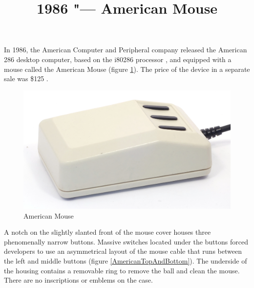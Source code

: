 \documentclass[11pt, a4paper]{article}
\begin{document}
\title{1986 "--- American Mouse}
\date{}
\maketitle

In 1986, the American Computer and Peripheral company released the American 286 desktop computer, based on the i80286 processor \cite{adv}, and equipped with a mouse called the American Mouse (figure \ref{fig:AmericanPic}). The price of the device in a separate sale was \$125 \cite{review}.

\begin{figure}[h]
    \centering
    \includegraphics[scale=0.7]{1986_american_mouse/pic_30.jpg}
    \caption{American Mouse}
    \label{fig:AmericanPic}
\end{figure}

A notch on the slightly slanted front of the mouse cover houses three phenomenally narrow buttons. Massive switches located under the buttons forced developers to use an asymmetrical layout of the mouse cable that runs between the left and middle buttons (figure \ref{AmericanTopAndBottom}). The underside of the housing contains a removable ring to remove the ball and clean the mouse. There are no inscriptions or emblems on the case.
\end{document}
